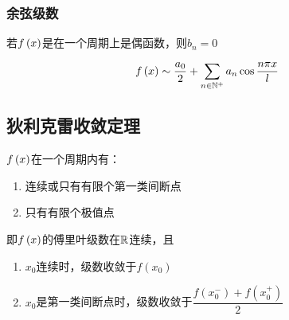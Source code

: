 \documentclass{article}
\begin{document}
\subsubsection{余弦级数}

若$f\left(x\right)$是在一个周期上是偶函数，则$b_n=0$

\[f\left(x\right)\sim\frac{a_0}2+\sum_{n\in\mathbb N^+}a_n\cos\frac{n\pi x}l\]

\subsection{狄利克雷收敛定理}

$f\left(x\right)$在一个周期内有：

\begin{enumerate}
    \item 连续或只有有限个第一类间断点
    \item 只有有限个极值点
\end{enumerate}

即$f\left(x\right)$的傅里叶级数在$\mathbb R$连续，且

\begin{enumerate}
    \item $x_0$连续时，级数收敛于$f(x_0)$
    \item $x_0$是第一类间断点时，级数收敛于$\dfrac{f(x_0^-)+f(x_0^+)}2$
\end{enumerate}
\end{document}
